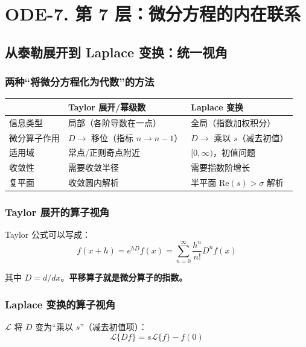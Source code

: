 \section{ODE-7. 第 7 层：微分方程的内在联系}

\subsection{从泰勒展开到 Laplace 变换：统一视角}

\subsubsection{两种“将微分方程化为代数”的方法}

\begin{center}
\begin{tabular}{L{2cm}L{5cm}L{5cm}}
\toprule
 & \textbf{Taylor 展开/幂级数} & \textbf{Laplace 变换} \\
\midrule
信息类型 & 局部（各阶导数在一点） & 全局（指数加权积分） \\
微分算子作用 & $D \to$ 移位（指标 $n \to n-1$） & $D \to$ 乘以 $s$（减去初值） \\
适用域 & 常点/正则奇点附近 & $[0,\infty)$，初值问题 \\
收敛性 & 需要收敛半径 & 需要指数阶增长 \\
复平面 & 收敛圆内解析 & 半平面 $\text{Re}(s) > \sigma$ 解析 \\
\bottomrule
\end{tabular}
\end{center}

\subsubsection{Taylor 展开的算子视角}

Taylor 公式可以写成：
\[
f(x + h) = e^{hD}f(x) = \sum_{n=0}^{\infty} \frac{h^n}{n!}D^n f(x)
\]

其中 $D = d/dx$。\textbf{平移算子就是微分算子的指数。}

\subsubsection{Laplace 变换的算子视角}

$\mathcal{L}$ 将 $D$ 变为“乘以 $s$”（减去初值项）：
\[
\mathcal{L}\{Df\} = s\mathcal{L}\{f\} - f(0)
\]

